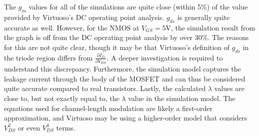 The $g_{m}$ values for all of the simulations are quite close (within 5\%) of the value provided by Virtuoso's DC operating point analysis. $g_{ds}$ is generally quite accurate as well. However, for the NMOS at $V_{GS} = 5$\si{\volt}, the simulation result from the graph is off from the DC operating point analysis by over 30\%. The reasons for this are not quite clear, though it may be that Virtuoso's definition of $g_{ds}$ in the triode region differs from $\frac{\partial I_{D}}{\partial V_{DS}}$. A deeper investigation is required to understand this discrepancy. Furthermore, the simulation model captures the leakage current through the body of the MOSFET and can thus be considered quite accurate compared to real transistors. Lastly, the calculated $\lambda$ values are close to, but not exactly equal to, the $\lambda$ value in the simulation model. The equations used for channel-length modulation are likely a first-order approximation, and Virtuoso may be using a higher-order model that considers $V_{DS}^2$ or even $V_{DS}^3$ terms.
